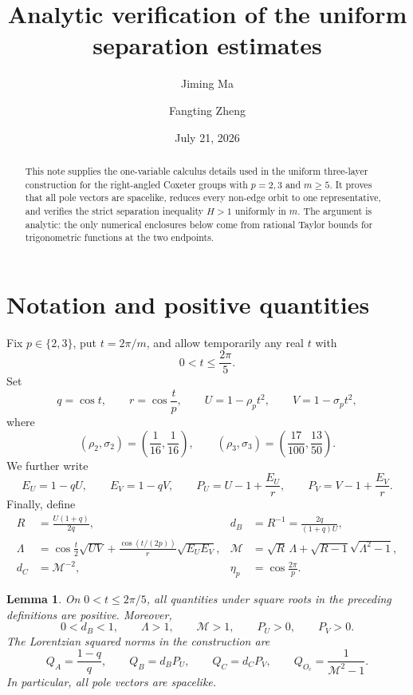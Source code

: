 \documentclass{amsart}
\title[Analytic verification]{Analytic verification of the uniform
separation estimates}
\author{Jiming Ma}
\author{Fangting Zheng}
\date{July 21, 2026}
\newtheorem{lemma}{Lemma}
\begin{document}
\begin{abstract}
This note supplies the one-variable calculus details used in the uniform
three-layer construction for the right-angled Coxeter groups with
\(p=2,3\) and \(m\geq5\).  It proves that all pole vectors are spacelike,
reduces every non-edge orbit to one representative, and verifies the strict
separation inequality \(H>1\) uniformly in \(m\).  The argument is analytic:
the only numerical enclosures below come from rational Taylor bounds for
trigonometric functions at the two endpoints.
\end{abstract}

\maketitle

\section{Notation and positive quantities}

Fix \(p\in\{2,3\}\), put \(t=2\pi/m\), and allow temporarily any real
\(t\) with
\[
 0<t\leq \frac{2\pi}{5}.
\]
Set
\[
 q=\cos t,\qquad r=\cos\frac tp,
 \qquad U=1-\rho_pt^2,\qquad V=1-\sigma_pt^2,
\]
where
\[
 (\rho_2,\sigma_2)=\left(\frac1{16},\frac1{16}\right),
 \qquad
 (\rho_3,\sigma_3)=\left(\frac{17}{100},\frac{13}{50}\right).
\]
We further write
\[
 E_U=1-qU,\qquad E_V=1-qV,
 \qquad
 P_U=U-1+\frac{E_U}{r},\qquad
 P_V=V-1+\frac{E_V}{r}.
\]
Finally, define
\begin{align*}
 R&=\frac{U(1+q)}{2q},
 &d_B&=R^{-1}=\frac{2q}{(1+q)U},\\
 \Lambda&=\cos\frac t2\sqrt{UV}
 +\frac{\cos(t/(2p))}{r}\sqrt{E_UE_V},
 &\mathcal M&=\sqrt R\,\Lambda
 +\sqrt{R-1}\sqrt{\Lambda^2-1},\\
 d_C&=\mathcal M^{-2},
 &\eta_p&=\cos\frac{2\pi}{p}.
\end{align*}

\begin{lemma}\label{lem:positive}
On \(0<t\leq2\pi/5\), all quantities under square roots in the preceding
definitions are positive.  Moreover,
\[
 0<d_B<1,\qquad \Lambda>1,\qquad \mathcal M>1,
 \qquad P_U>0,\qquad P_V>0.
\]
The Lorentzian squared norms in the construction are
\begin{equation}\label{eq:norms}
 Q_A=\frac{1-q}{q},\qquad Q_B=d_BP_U,\qquad
 Q_C=d_CP_V,\qquad Q_{O_c}=\frac1{\mathcal M^2-1}.
\end{equation}
In particular, all pole vectors are spacelike.
\end{lemma}
\end{document}
